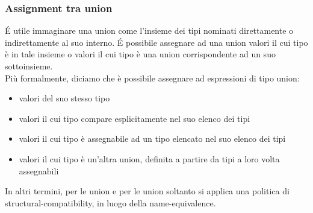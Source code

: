 \subsubsection{Assignment tra union}
É utile immaginare una union come l'insieme dei tipi nominati direttamente
o indirettamente al suo interno. É possibile assegnare ad una union valori il cui tipo è
in tale insieme o valori il cui tipo è una union corrispondente ad un suo sottoinsieme. \\

Più formalmente, diciamo che è possibile assegnare ad espressioni di tipo union:
\begin{itemize}
    \item valori del suo stesso tipo
    \item valori il cui tipo compare esplicitamente nel suo elenco dei tipi
    \item valori il cui tipo è assegnabile ad un tipo elencato nel suo elenco dei tipi
    \item valori il cui tipo è un’altra union, definita a partire da tipi a loro volta assegnabili
\end{itemize} 

\vspace{0.4cm}

In altri termini, per le union e per le union soltanto si applica una politica di structural-compatibility,
in luogo della name-equivalence.
\vspace{0.4cm}